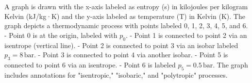 A graph is drawn with the x-axis labeled as entropy (s) in kilojoules per kilogram Kelvin (kJ/kg·K) and the y-axis labeled as temperature (T) in Kelvin (K). The graph depicts a thermodynamic process with points labeled 0, 1, 2, 3, 4, 5, and 6.  
- Point 0 is at the origin, labeled with \( p_0 \).  
- Point 1 is connected to point 2 via an isentrope (vertical line).  
- Point 2 is connected to point 3 via an isobar labeled \( p_3 = 8 \, \text{bar} \).  
- Point 3 is connected to point 4 via another isobar.  
- Point 5 is connected to point 6 via an isentrope.  
- Point 6 is labeled \( p_5 = 0.5 \, \text{bar} \).  
The graph includes annotations for "isentropic," "isobaric," and "polytropic" processes.